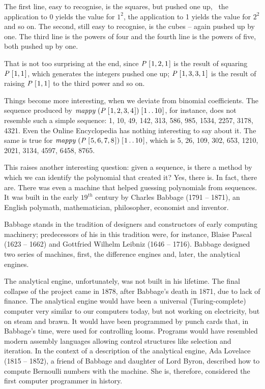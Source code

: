 \documentclass[tikz]{scrreprt}
\newcommand{\Conid}[1]{\mathit{#1}}
\newcommand{\Varid}[1]{\mathit{#1}}
\begin{document}
The first line, easy to recognise, is the squares, but pushed one up,
\ie\ the application to 0 yields the value for $1^2$, 
the application to 1 yields the value for $2^2$ and so on.
The second, still easy to recognise,
is the cubes -- again pushed up by one.
The third line is the powers of four 
and the fourth line is the powers of five,
both pushed up by one.

That is not too surprising at the end, since
\ensuremath{\Conid{P}\;[\mskip1.5mu \mathrm{1},\mathrm{2},\mathrm{1}\mskip1.5mu]} is the result of squaring \ensuremath{\Conid{P}\;[\mskip1.5mu \mathrm{1},\mathrm{1}\mskip1.5mu]}, 
which generates the integers pushed one up;
\ensuremath{\Conid{P}\;[\mskip1.5mu \mathrm{1},\mathrm{3},\mathrm{3},\mathrm{1}\mskip1.5mu]} is the result of raising \ensuremath{\Conid{P}\;[\mskip1.5mu \mathrm{1},\mathrm{1}\mskip1.5mu]} to the third power
and so on.

Things become more interesting, when we deviate
from binomial coefficients. The sequence
produced by \ensuremath{\Varid{mappy}\;(\Conid{P}\;[\mskip1.5mu \mathrm{1},\mathrm{2},\mathrm{3},\mathrm{4}\mskip1.5mu])\;[\mskip1.5mu \mathrm{1}\mathinner{\ldotp\ldotp}\mathrm{10}\mskip1.5mu]}, for instance,
does not resemble such a simple sequence:
1, 10, 49, 142, 313, 586, 985, 1534, 2257, 3178, 4321.
Even the Online Encyclopedia has nothing interesting
to say about it.
The same is true for \ensuremath{\Varid{mappy}\;(\Conid{P}\;[\mskip1.5mu \mathrm{5},\mathrm{6},\mathrm{7},\mathrm{8}\mskip1.5mu])\;[\mskip1.5mu \mathrm{1}\mathinner{\ldotp\ldotp}\mathrm{10}\mskip1.5mu]},
which is 5, 26, 109, 302, 653, 1210, 2021, 3134, 4597, 6458, 8765.

This raises another interesting question:
given a sequence, is there a method by which 
we can identify the polynomial that created it?
Yes, there is. In fact, there are.
There was even a machine that helped guessing
polynomials from sequences. It was built in the early
$19^{th}$ century by Charles Babbage (1791 -- 1871),
an English polymath, mathematician, philosopher,
economist and inventor.

Babbage stands in the tradition of designers and constructors
of early computing machinery; predecessors of his
in this tradition were, for instance, 
Blaise Pascal (1623 -- 1662) and
Gottfried Wilhelm Leibniz (1646 -- 1716).
Babbage designed two series of machines,
first, the difference engines and, later, 
the analytical engines.

The analytical engine, unfortunately, was not built in his lifetime.
The final collapse of the project came 
in 1878, after Babbage's death in 1871, 
due to lack of finance. 
The analytical engine would have been 
a universal (Turing-complete) computer
very similar to our computers today,
but not working on electricity, but on steam and brawn.
It would have been programmed by punch cards that,
in Babbage's time, were used for controlling looms.
Programs would have resembled modern assembly languages
allowing control structures like selection and iteration.
In the context of a description of the analytical engine,
Ada Lovelace (1815 -- 1852), 
a friend of Babbage and daughter of Lord Byron,
described how to compute Bernoulli numbers with the machine.
She is, therefore, considered the first computer programmer
in history.
\end{document}

